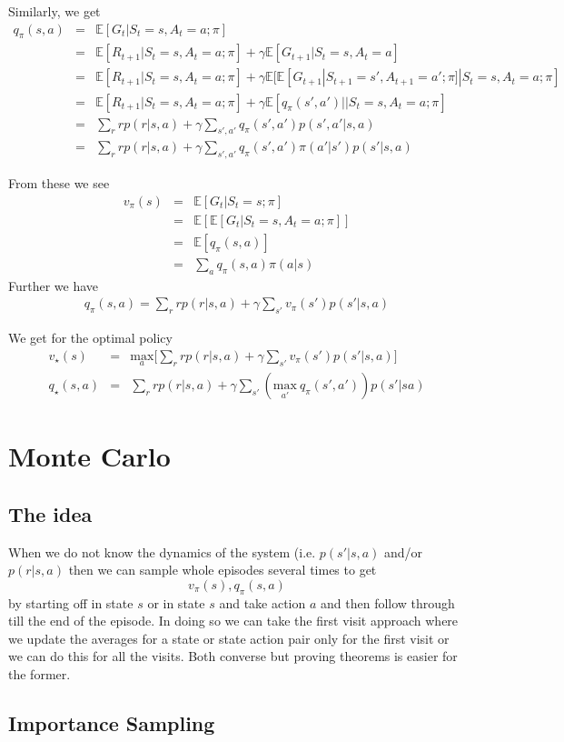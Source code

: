\documentclass[11pt,a4paper]{article}
\newcommand\be{\begin{equation}}
\newcommand\bea{\begin{eqnarray}}
\newcommand\ee{\end{equation}}
\newcommand\eea{\end{eqnarray}}
\newcommand{\nn}{\nonumber \\}
\newcommand{\e}[1]{\mathbb E[#1]}
\begin{document}
Similarly, we get
\bea
q_\pi(s,a) &=& \e{G_t | S_t=s,A_t=a;\pi} \nn
&=& \e{R_{t+1} |S_t=s,A_t=a;\pi} + \gamma \e{G_{t+1} | S_t=s, A_t=a} \nn
&=& \e{R_{t+1} |S_t=s,A_t=a;\pi} + \gamma \e{ \e{G_{t+1} | S_{t+1}=s',A_{t+1}=a';\pi}|S_t=s, A_t=a;\pi} \nn
&=& \e{R_{t+1} |S_t=s,A_t=a;\pi} + \gamma \e{ q_\pi(s',a')||S_t=s, A_t=a;\pi} \nn
&=& \sum_r r p(r|s,a) + \gamma \sum_{s',a'} q_\pi(s',a') p(s',a'|s,a) \nn
&=&  \sum_r r p(r|s,a) + \gamma \sum_{s',a'} q_\pi(s',a') \pi(a'|s') p(s'|s,a)
\eea

From these we see
\bea
v_\pi(s) &=&  \e{G_t|S_t=s;\pi} \nn
&=& \e{\e{G_t|S_t=s,A_t=a;\pi} } \nn
&=& \e{q_\pi(s,a)} \nn
&=& \sum_a q_\pi(s,a) \pi(a|s)
\eea
Further we have
\bea
q_\pi(s,a) = \sum_r r p(r|s,a) + \gamma \sum_{s'} v_\pi(s') p(s'|s,a)
\eea


We get for the optimal policy
\bea
v_\star(s) &=&\underset{a}{\text{max}}  \Bigg[\sum_r r p(r|s,a) + \gamma \sum_{s'} v_\pi(s') p(s'|s,a) \Bigg]  \\
q_\star(s,a) &=& \sum_r r p(r|s,a)  + \gamma \sum_{s'} \left( \underset{a'}{\text{max}} ~q_\pi(s',a') \right)p(s'|sa)
\eea



\section{Monte Carlo}

\subsection{The idea}

When we do not know the dynamics of the system (i.e. $p(s'|s,a)$ and/or $p(r|s,a)$ then we can sample whole episodes several times to get
\be
v_\pi(s), q_\pi(s,a)
\ee 
by starting off in state $s$ or in state $s$ and take action $a$ and then follow through till the end of the episode. In doing so we can take the first visit approach where we update the averages for a state or state action pair only for the first visit or we can do this for all the visits. Both converse but proving theorems is easier for the former.

\subsection{Importance Sampling}
\end{document}
